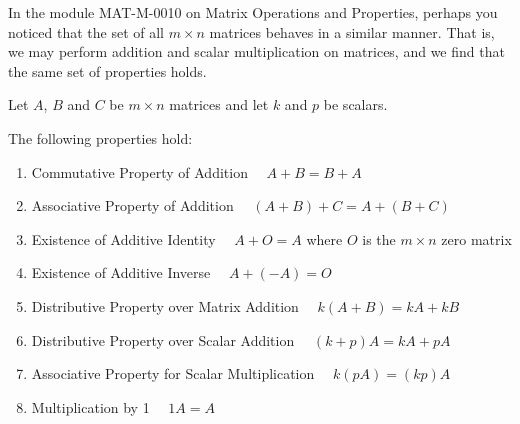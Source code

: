 \documentclass{ximera}
\begin{document}
In the module MAT-M-0010 on Matrix Operations and Properties, perhaps you noticed that the set of all $m \times n$ matrices behaves in a similar manner.  That is, we may perform addition and scalar multiplication on matrices, and we find that the same set of properties holds.


  \begin{theorem}\label{matrix_properties} Let ${A}$, ${B}$ and ${C}$ be $m \times n$ matrices and let $k$ and $p$ be scalars.
  
  The following properties hold:
  \begin{enumerate}
  \item 
  Commutative Property of Addition  $\quad A+B=B+A$
  \item 
  Associative Property of Addition $\quad (A+B)+C=A+(B+C)$
  \item 
  Existence of Additive Identity  $\quad A+O=A$ where $O$ is the $m \times n$ zero matrix
  \item 
  Existence of Additive Inverse  $\quad A+(-A)=O$
  \item
  Distributive Property over Matrix Addition  $\quad k(A+B)=kA+kB$
  \item
  Distributive Property over Scalar Addition  $\quad (k+p)A=kA+pA$
  \item 
  Associative Property for Scalar Multiplication $\quad k(pA)=(kp)A$
  \item 
  Multiplication by 1 $\quad 1A=A$
  \end{enumerate}
\end{theorem}
\end{document}
